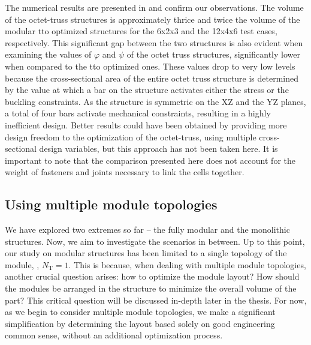 The numerical results are presented in  and confirm our observations. The volume of the octet-truss structures is approximately thrice and twice the volume of the modular \gls{tto} optimized structures for the 6x2x3 and the 12x4x6 test cases, respectively. This significant gap between the two structures is also evident when examining the values of $\varphi$ and $\psi$ of the octet truss structures, significantly lower when compared to the \gls{tto} optimized ones. These values drop to very low levels because the cross-sectional area of the entire octet truss structure is determined by the value at which a bar on the structure activates either the stress or the buckling constraints. As the structure is symmetric on the XZ and the YZ planes, a total of four bars activate mechanical constraints, resulting in a highly inefficient design. Better results could have been obtained by providing more design freedom to the optimization of the octet-truss, using multiple cross-sectional design variables, but this approach has not been taken here. It is important to note that the comparison presented here does not account for the weight of fasteners and joints necessary to link the cells together.

\subsection{Using multiple module topologies}
We have explored two extremes so far -- the fully modular and the monolithic structures. Now, we aim to investigate the scenarios in between. Up to this point, our study on modular structures has been limited to a single topology of the module, \ie, $N_\text{T}=1$. This is because, when dealing with multiple module topologies, another crucial question arises: how to optimize the module layout? How should the modules be arranged in the structure to minimize the overall volume of the part? This critical question will be discussed in-depth later in the thesis. For now, as we begin to consider multiple module topologies, we make a significant simplification by determining the layout based solely on good engineering common sense, without an additional optimization process.


